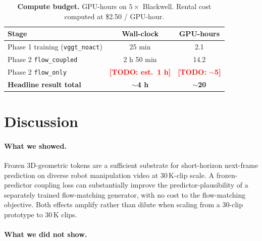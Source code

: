 \documentclass[10pt,letterpaper]{article}
\newcommand{\TODO}[1]{\textcolor{red}{\textbf{[TODO: #1]}}}
\begin{document}
\begin{table}[t]
\centering
\caption{\textbf{Compute budget.} GPU-hours on $5\times$ Blackwell. Rental cost computed at \$2.50 / GPU-hour.}
\label{tab:cost}
\begin{tabular}{lcc}
\toprule
Stage & Wall-clock & GPU-hours \\
\midrule
Phase 1 training (\texttt{vggt\_noact}) & 25 min & 2.1 \\
Phase 2 \texttt{flow\_coupled} & 2 h 50 min & 14.2 \\
Phase 2 \texttt{flow\_only} & \TODO{est.\ 1 h} & \TODO{$\sim$5} \\
\midrule
\textbf{Headline result total} & \textbf{$\sim$4 h} & \textbf{$\sim$20} \\
\bottomrule
\end{tabular}
\end{table}

\section{Discussion}

\paragraph{What we showed.}
Frozen 3D-geometric tokens are a sufficient substrate for short-horizon next-frame prediction on diverse robot manipulation video at 30\,K-clip scale. A frozen-predictor coupling loss can substantially improve the predictor-plausibility of a separately trained flow-matching generator, with no cost to the flow-matching objective. Both effects amplify rather than dilute when scaling from a 30-clip prototype to 30\,K clips.

\paragraph{What we did not show.}
\end{document}
